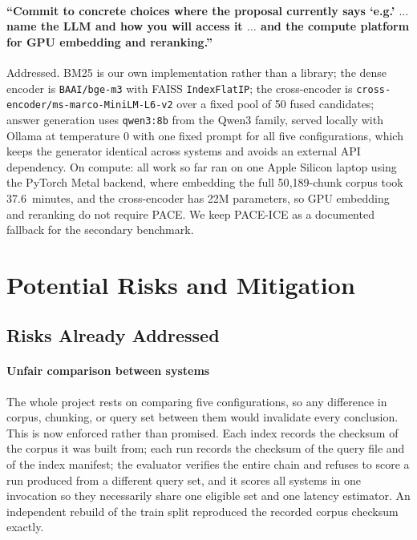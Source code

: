 \documentclass[sigconf,nonacm]{acmart}
\begin{document}
\paragraph{``Commit to concrete choices where the proposal currently says `e.g.'
$\ldots$ name the LLM and how you will access it $\ldots$ and the compute
platform for GPU embedding and reranking.''} Addressed. BM25 is our own
implementation rather than a library; the dense encoder is
\texttt{BAAI/bge-m3} with FAISS \texttt{IndexFlatIP}; the cross-encoder is
\texttt{cross-encoder/\allowbreak ms-marco-MiniLM-L6-v2} over a fixed pool of 50 fused
candidates; answer generation uses \texttt{qwen3:8b} from the Qwen3 family,
served locally with Ollama at temperature 0 with one fixed prompt for all five
configurations, which keeps the generator identical across systems and avoids
an external API dependency. On compute: all work so far ran on one Apple Silicon
laptop using the PyTorch Metal backend, where embedding the full 50{,}189-chunk
corpus took 37.6~minutes, and the cross-encoder has 22M parameters, so GPU
embedding and reranking do not require PACE. We keep PACE-ICE as a documented
fallback for the secondary benchmark.

\section{Potential Risks and Mitigation}

\subsection{Risks Already Addressed}

\paragraph{Unfair comparison between systems} The whole project rests on
comparing five configurations, so any difference in corpus, chunking, or query
set between them would invalidate every conclusion. This is now enforced rather
than promised. Each index records the checksum of the corpus it was built from;
each run records the checksum of the query file and of the index manifest; the
evaluator verifies the entire chain and refuses to score a run produced from a
different query set, and it scores all systems in one invocation so they
necessarily share one eligible set and one latency estimator. An independent
rebuild of the train split reproduced the recorded corpus checksum exactly.
\end{document}

